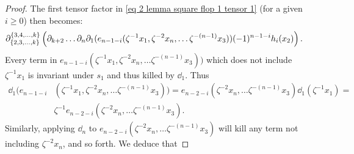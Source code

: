 \begin{proof}
    The first tensor factor in \eqref{eq 2 lemma square flop 1 tensor 1} (for a given $i\geq0$) then becomes:
    \begin{align}
    &\partial^{\{3,4, \ldots, k\}}_{\{2, 3, \ldots, k\}} \left(
    \partial_{k+2}\ldots \partial_n \partial_1 (e_{n-1-i}(\zeta^{-1}x_1, \zeta^{-2}x_n, \ldots \zeta^{-(n-1)}x_3))(-1)^{n-1-i}h_i(x_2)    
    \right). \label{eq 3 lemma square flop 1 tensor 1}
    \end{align}
    Every term in $e_{n-1-i}(\zeta^{-1}x_1, \zeta^{-2}x_n, \ldots \zeta^{-(n-1)}x_3))$ which does not include $\zeta^{-1} x_1$ is invariant under $s_1$ and thus killed by $\dd_1$. Thus
    \begin{align} \dd_1(e_{n-1-i}&(\zeta^{-1}x_1, \zeta^{-2}x_n, \ldots \zeta^{-(n-1)}x_3)) = e_{n-2-i}(\zeta^{-2}x_n, \ldots \zeta^{-(n-1)}x_3) \dd_1(\zeta^{-1} x_1) = \nonumber \\
    & \zeta^{-1} e_{n-2-i}(\zeta^{-2}x_n, \ldots \zeta^{-(n-1)}x_3). \end{align}
    Similarly, applying $\dd_n$ to $e_{n-2-i}(\zeta^{-2}x_n, \ldots \zeta^{-(n-1)}x_3)$ will kill any term not including $\zeta^{-2} x_n$, and so forth. We deduce that

\end{proof}
